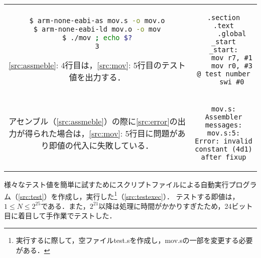\begin{tabular}[c]{cc}
    \begin{minipage}[t]{0.45\textwidth}
        \centering
        \begin{lstlisting}[caption={アセンブル},label={src:assmeble},language={Bash},frame={left}]
$ arm-none-eabi-as mov.s -o mov.o
$ arm-none-eabi-ld mov.o -o mov
$ ./mov ; echo $?
3
    \end{lstlisting}
        \begin{flushleft}
            \ref{src:assmeble}: 4行目は，\ref{src:mov}: 5行目のテスト値を出力する．
        \end{flushleft}
    \end{minipage} &
    \begin{minipage}[t]{0.45\textwidth}
        \centering
        \begin{lstlisting}[caption={{\ttfamily mov.s}},label={src:mov},frame={left}]
    .section    .text
    .global     _start
_start:
    mov r7, #1
    mov r0, #3 @ test number
    swi #0
\end{lstlisting}
    \end{minipage}
    \vspace{0.5em}                                                                          \\
    \begin{minipage}[c]{0.45\textwidth}
        アセンブル（\ref{src:assmeble}）の際に\ref{src:error}の出力が得られた場合は，\ref{src:mov}: 5行目に問題があり即値の代入に失敗している．
    \end{minipage}
    \hspace{1em}                                                                          &
    \begin{minipage}[c]{0.45\textwidth}
        \begin{lstlisting}[numbers={none},caption={Error出力},label={src:error},frame={single}]
mov.s: Assembler messages:
mov.s:5: Error: invalid constant (4d1) after fixup
    \end{lstlisting}
    \end{minipage}
\end{tabular}
様々なテスト値を簡単に試すためにスクリプトファイルによる自動実行プログラム（\ref{src:test}）を作成し，実行した\footnote{実行するに際して，空ファイル{\ttfamily test.s}を作成し，{\ttfamily mov.s}の一部を変更する必要がある．}（\ref{src:testexec}）．
テストする即値は，\(1\leq N\leq 2^{25}\)である．また，\(2^{21}\)以降は処理に時間がかかりすぎたため，24ビット目に着目して手作業でテストした．
